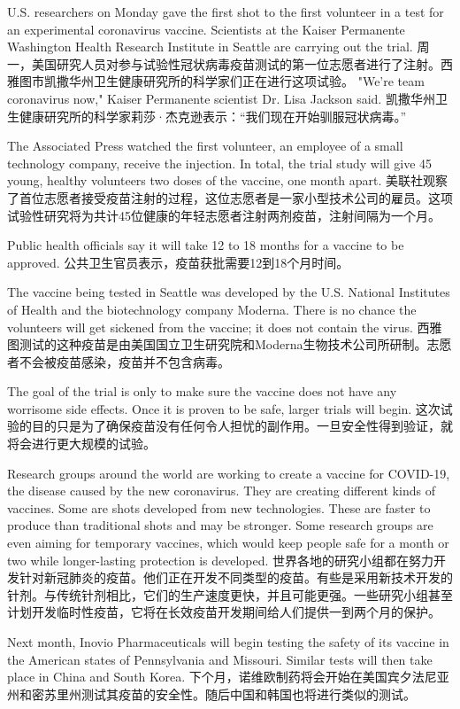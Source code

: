 U.S. researchers on Monday gave the first shot to the first volunteer in a test for an experimental coronavirus vaccine. Scientists at the Kaiser Permanente Washington Health Research Institute in Seattle are carrying out the trial.
周一，美国研究人员对参与试验性冠状病毒疫苗测试的第一位志愿者进行了注射。西雅图市凯撒华州卫生健康研究所的科学家们正在进行这项试验。
"We're team coronavirus now," Kaiser Permanente scientist Dr. Lisa Jackson said.
凯撒华州卫生健康研究所的科学家莉莎·杰克逊表示：“我们现在开始驯服冠状病毒。”

The Associated Press watched the first volunteer, an employee of a small technology company, receive the injection. In total, the trial study will give 45 young, healthy volunteers two doses of the vaccine, one month apart.
美联社观察了首位志愿者接受疫苗注射的过程，这位志愿者是一家小型技术公司的雇员。这项试验性研究将为共计45位健康的年轻志愿者注射两剂疫苗，注射间隔为一个月。

Public health officials say it will take 12 to 18 months for a vaccine to be approved.
公共卫生官员表示，疫苗获批需要12到18个月时间。

The vaccine being tested in Seattle was developed by the U.S. National Institutes of Health and the biotechnology company Moderna. There is no chance the volunteers will get sickened from the vaccine; it does not contain the virus.
西雅图测试的这种疫苗是由美国国立卫生研究院和Moderna生物技术公司所研制。志愿者不会被疫苗感染，疫苗并不包含病毒。

The goal of the trial is only to make sure the vaccine does not have any worrisome side effects. Once it is proven to be safe, larger trials will begin.
这次试验的目的只是为了确保疫苗没有任何令人担忧的副作用。一旦安全性得到验证，就将会进行更大规模的试验。

Research groups around the world are working to create a vaccine for COVID-19, the disease caused by the new coronavirus. They are creating different kinds of vaccines. Some are shots developed from new technologies. These are faster to produce than traditional shots and may be stronger. Some research groups are even aiming for temporary vaccines, which would keep people safe for a month or two while longer-lasting protection is developed.
世界各地的研究小组都在努力开发针对新冠肺炎的疫苗。他们正在开发不同类型的疫苗。有些是采用新技术开发的针剂。与传统针剂相比，它们的生产速度更快，并且可能更强。一些研究小组甚至计划开发临时性疫苗，它将在长效疫苗开发期间给人们提供一到两个月的保护。

Next month, Inovio Pharmaceuticals will begin testing the safety of its vaccine in the American states of Pennsylvania and Missouri. Similar tests will then take place in China and South Korea.
下个月，诺维欧制药将会开始在美国宾夕法尼亚州和密苏里州测试其疫苗的安全性。随后中国和韩国也将进行类似的测试。

